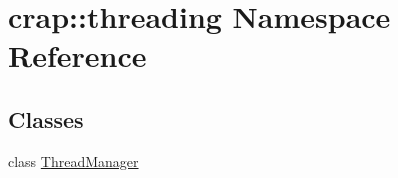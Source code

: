 \hypertarget{namespacecrap_1_1threading}{\section{crap\-:\-:threading Namespace Reference}
\label{namespacecrap_1_1threading}
}
\subsection*{Classes}
\begin{DoxyCompactItemize}
\item 
class \hyperlink{classcrap_1_1threading_1_1_thread_manager}{Thread\-Manager}
\end{DoxyCompactItemize}
